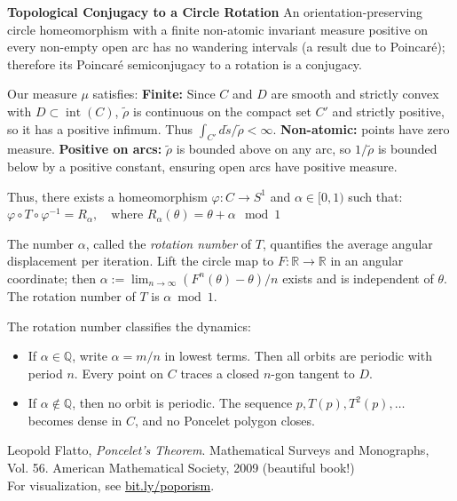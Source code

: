 \begin{technical}
  \textbf{Topological Conjugacy to a Circle Rotation}
  An orientation-preserving circle homeomorphism with a finite non-atomic invariant measure positive on every non-empty open arc has no wandering intervals (a result due to Poincaré); therefore its Poincaré semiconjugacy to a rotation is a conjugacy.
  
  Our measure \( \mu \) satisfies: \textbf{Finite:} Since \( C \) and \( D \) are smooth and strictly convex with \( D \subset \operatorname{int}(C) \), \( \tilde{\rho} \) is continuous on the compact set \( C' \) and strictly positive, so it has a positive infimum. Thus \( \int_{C'} d\tilde{s}/\tilde{\rho} < \infty \). \textbf{Non-atomic:} points have zero measure. \textbf{Positive on arcs:} \( \tilde{\rho} \) is bounded above on any arc, so \( 1/\tilde{\rho} \) is bounded below by a positive constant, ensuring open arcs have positive measure.
  
  Thus, there exists a homeomorphism \( \varphi: C \to S^1 \) and \( \alpha \in [0,1) \) such that: $ \varphi \circ T \circ \varphi^{-1} = R_\alpha, \quad \text{where } R_\alpha(\theta) = \theta + \alpha \mod 1$
  
  The number \( \alpha \), called the \emph{rotation number} of \( T \), quantifies the average angular displacement per iteration. Lift the circle map to \( F: \mathbb{R} \to \mathbb{R} \) in an angular coordinate; then $\alpha := \lim_{n \to \infty} {(F^n(\theta) - \theta)}/{n}$ exists and is independent of \( \theta \). The rotation number of \( T \) is \( \alpha \bmod 1 \).
  
  The rotation number classifies the dynamics:
  \begin{itemize}
    \item If \( \alpha \in \mathbb{Q} \), write \( \alpha = {m}/{n} \) in lowest terms. Then all orbits are periodic with period \( n \). Every point on \( C \) traces a closed \( n \)-gon tangent to \( D \).
    \item If \( \alpha \notin \mathbb{Q} \), then no orbit is periodic. The sequence \( p, T(p), T^2(p), \ldots \) becomes dense in \( C \), and no Poncelet polygon closes.
  \end{itemize}
  
  \techref
  {\footnotesize
  Leopold Flatto, \textit{Poncelet's Theorem}. Mathematical Surveys and Monographs, Vol. 56. American Mathematical Society, 2009 (beautiful book!)\\
  For visualization, see \href{https://bit.ly/poporism}{\textcolor{black}{bit.ly/poporism}}.\\
  }
  \end{technical}
  